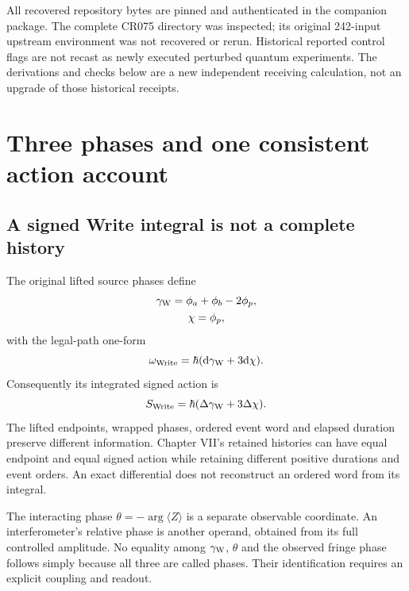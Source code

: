 All recovered repository bytes are pinned and authenticated in the companion package. The complete CR075 directory was inspected; its original 242-input upstream environment was not recovered or rerun. Historical reported control flags are not recast as newly executed perturbed quantum experiments. The derivations and checks below are a new independent receiving calculation, not an upgrade of those historical receipts.

\section{Three phases and one consistent action account}
\subsection{A signed Write integral is not a complete history}
The original lifted source phases define
\begin{equation}
\begin{gathered}
\gamma_{\rm W}=\phi_a+\phi_b-2\phi_p,
 \\
 \chi=\phi_p,
\end{gathered}
\end{equation}
with the legal-path one-form
\begin{equation}
 \omega_{\rm Write}=\hbar(\mathrm d\gamma_{\rm W}+3\mathrm d\chi).
\end{equation}
Consequently its integrated signed action is
\begin{equation}
 S_{\rm Write}=\hbar(\Delta\gamma_{\rm W}+3\Delta\chi).
\end{equation}
The lifted endpoints, wrapped phases, ordered event word and elapsed duration preserve different information. Chapter VII's retained histories can have equal endpoint and equal signed action while retaining different positive durations and event orders.\cite{chapter1} An exact differential does not reconstruct an ordered word from its integral.

The interacting phase $\theta=-\arg\langle Z\rangle$ is a separate observable coordinate. An interferometer's relative phase is another operand, obtained from its full controlled amplitude. No equality among $\gamma_{\rm W}$, $\theta$ and the observed fringe phase follows simply because all three are called phases. Their identification requires an explicit coupling and readout.

